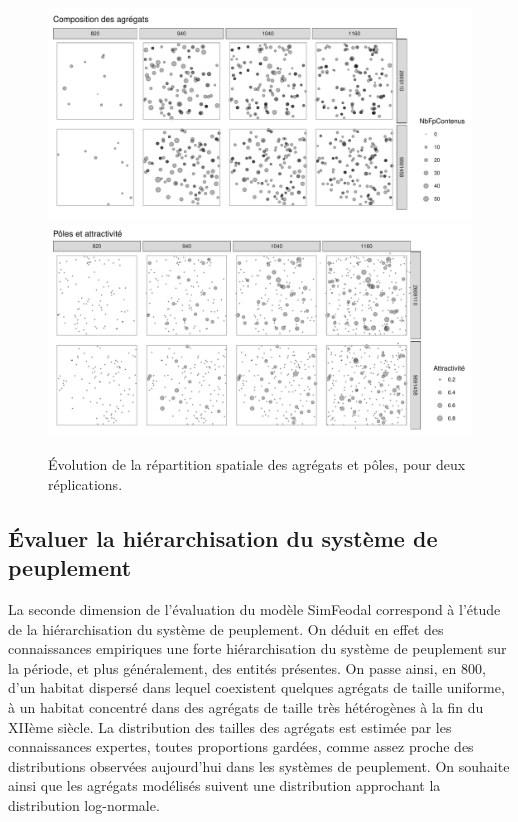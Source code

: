 \begin{figure}[H]
\captionsetup{width=\linewidth}
\includegraphics[width=\linewidth]{img/resultats/v0_cartes_agregats.pdf}
\includegraphics[width=\linewidth]{img/resultats/v0_cartes_poles.pdf}
\caption{Évolution de la répartition spatiale des agrégats et pôles, pour deux réplications.} 
\label{fig:cartes-agregats-v0} 
\end{figure}

\clearpage

\subsection{Évaluer la hiérarchisation du système de peuplement}

La seconde dimension de l'évaluation du modèle SimFeodal correspond à l'étude de la hiérarchisation du système de peuplement.
On déduit en effet des connaissances empiriques une forte hiérarchisation du système de peuplement sur la période, et plus généralement, des entités présentes.
On passe ainsi, en 800, d'un habitat dispersé dans lequel coexistent quelques agrégats de taille uniforme, à un habitat concentré dans des agrégats de taille très hétérogènes à la fin du XIIème siècle.
La distribution des tailles des agrégats est estimée par les connaissances expertes, toutes proportions gardées, comme assez proche des distributions observées aujourd'hui dans les systèmes de peuplement.
On souhaite ainsi que les agrégats modélisés suivent une distribution approchant la distribution log-normale.

